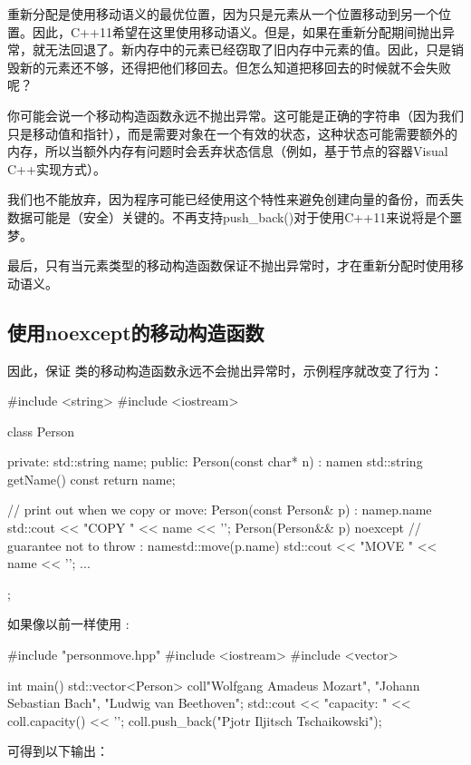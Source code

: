 重新分配是使用移动语义的最优位置，因为只是元素从一个位置移动到另一个位置。因此，C++11希望在这里使用移动语义。但是，如果在重新分配期间抛出异常，就无法回退了。新内存中的元素已经窃取了旧内存中元素的值。因此，只是销毁新的元素还不够，还得把他们移回去。但怎么知道把移回去的时候就不会失败呢？

你可能会说一个移动构造函数永远不抛出异常。这可能是正确的字符串（因为我们只是移动值和指针），而是需要对象在一个有效的状态，这种状态可能需要额外的内存，所以当额外内存有问题时会丢弃状态信息（例如，基于节点的容器Visual C++实现方式）。

我们也不能放弃，因为程序可能已经使用这个特性来避免创建向量的备份，而丢失数据可能是（安全）关键的。不再支持push_back()对于使用C++11来说将是个噩梦。

最后，只有当元素类型的移动构造函数保证不抛出异常时，才在重新分配时使用移动语义。

\subsection{使用noexcept的移动构造函数}

因此，保证  类的移动构造函数永远不会抛出异常时，示例程序就改变了行为：

\begin{cppcode}
#include <string>
#include <iostream>

class Person {
	private:
	std::string name;
	public:
	Person(const char* n)
	: name{n} {
	}
	std::string getName() const {
		return name;
	}

	// print out when we copy or move:
	Person(const Person& p)
	: name{p.name} {
		std::cout << "COPY " << name << '\n';
	}
	Person(Person&& p) noexcept // guarantee not to throw
	: name{std::move(p.name)} {
		std::cout << "MOVE " << name << '\n';
	}
	...
};
\end{cppcode}

如果像以前一样使用 :

\begin{cppcode}
#include "personmove.hpp"
#include <iostream>
#include <vector>

int main()
{
	std::vector<Person> coll{"Wolfgang Amadeus Mozart",
		"Johann Sebastian Bach",
		"Ludwig van Beethoven"};
	std::cout << "capacity: " << coll.capacity() << '\n';
	coll.push_back("Pjotr Iljitsch Tschaikowski");
}
\end{cppcode}

可得到以下输出：

